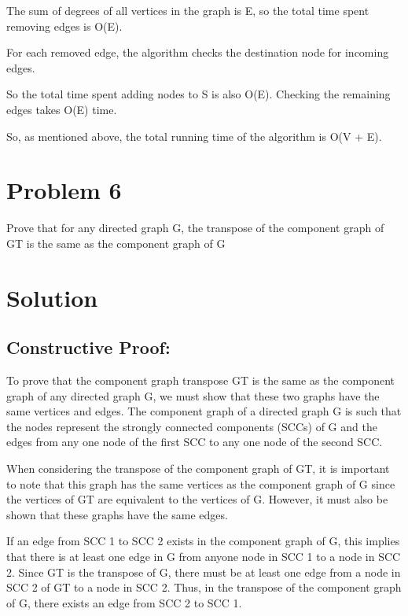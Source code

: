 \documentclass{article}
\begin{document}
The sum of degrees of all vertices in the graph is E, so the total time spent removing edges is O(E).\newline

For each removed edge, the algorithm checks the destination node for incoming edges.\newline

So the total time spent adding nodes to S is also O(E).
Checking the remaining edges takes O(E) time.\newline

So, as mentioned above, the total running time of the algorithm is O(V + E).

\pagebreak

\section*{\huge Problem 6}

\Large  Prove that for any directed graph G, the transpose of the component graph of GT is the same as the component graph of G

\section*{\huge Solution}
\subsection*{\huge Constructive Proof:}
\large To prove that the component graph transpose GT is the same as the component graph of any directed graph G, we must show that these two graphs have the same vertices and edges.
The component graph of a directed graph G is such that the nodes represent the strongly connected components (SCCs) of G and the edges from any one node of the first SCC to any one node of the second SCC.\newline


When considering the transpose of the component graph of GT, it is important to note that this graph has the same vertices as the component graph of G since the vertices of GT are equivalent to the vertices of G. However, it must also be shown that these graphs have the same edges.\newline


If an edge from SCC 1 to SCC 2 exists in the component graph of G, this implies that there is at least one edge in G from anyone node in SCC 1 to a node in SCC 2. Since GT is the transpose of G, there must be at least one edge from a node in SCC 2 of GT to a node in SCC 2. Thus, in the transpose of the component graph of G, there exists an edge from SCC 2 to SCC 1.\newline
\end{document}
